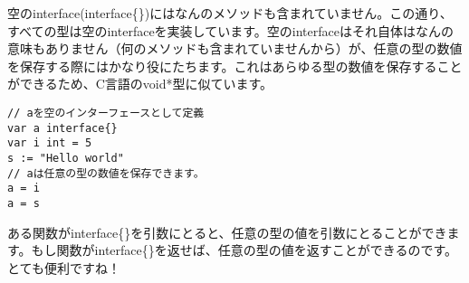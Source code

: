 空のinterface(interface\{\})にはなんのメソッドも含まれていません。この通り、すべての型は空のinterfaceを実装しています。空のinterfaceはそれ自体はなんの意味もありません（何のメソッドも含まれていませんから）が、任意の型の数値を保存する際にはかなり役にたちます。これはあらゆる型の数値を保存することができるため、C言語のvoid*型に似ています。

\begin{lstlisting}[numbers=none]
// aを空のインターフェースとして定義
var a interface{}
var i int = 5
s := "Hello world"
// aは任意の型の数値を保存できます。
a = i
a = s
\end{lstlisting}

ある関数がinterface\{\}を引数にとると、任意の型の値を引数にとることができます。もし関数がinterface\{\}を返せば、任意の型の値を返すことができるのです。とても便利ですね！
